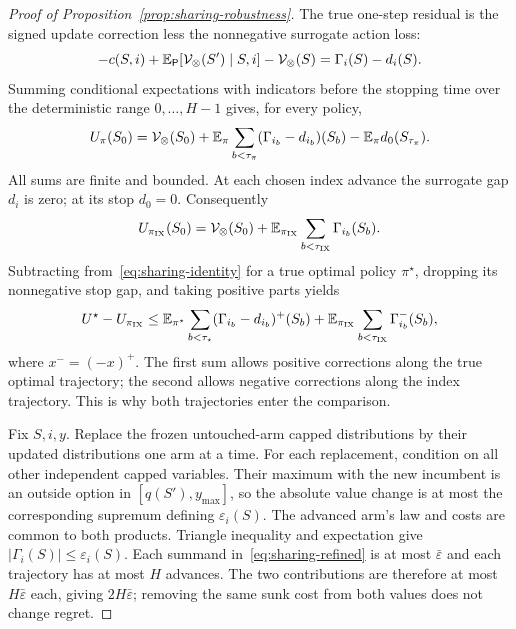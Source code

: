 \begin{proof}[Proof of Proposition~\ref{prop:sharing-robustness}]
The true one-step residual is the signed update correction less the
nonnegative surrogate action loss:
\begin{equation}
 -c(S,i)+\mathbb{E}_{\mathsf P}[\mathcal V_\otimes(S')\mid S,i]-\mathcal V_\otimes(S)
       =\Gamma_i(S)-d_i(S).
 \label{eq:sharing-residual}
\end{equation}
Summing conditional expectations with indicators before the stopping time over
the deterministic range $0,\ldots,H-1$ gives, for every policy,
\begin{equation}
 U_\pi(S_0)=\mathcal V_\otimes(S_0)
 +\mathbb{E}_\pi\sum_{b<\tau_\pi}(\Gamma_{i_b}-d_{i_b})(S_b)
 -\mathbb{E}_\pi d_0(S_{\tau_\pi}).
 \label{eq:sharing-identity}
\end{equation}
All sums are finite and bounded. At each chosen index advance the surrogate
gap $d_i$ is zero; at its stop $d_0=0$. Consequently
\begin{equation}
 U_{\pi_{\rm IX}}(S_0)=\mathcal V_\otimes(S_0)
       +\mathbb{E}_{\pi_{\rm IX}}\sum_{b<\tau_{\rm IX}}\Gamma_{i_b}(S_b).
 \label{eq:sharing-index-identity}
\end{equation}
Subtracting from~\eqref{eq:sharing-identity} for a true optimal policy
$\pi^\star$, dropping its nonnegative stop gap, and taking positive parts yields
\begin{equation}
 U^\star-U_{\pi_{\rm IX}}
 \le\mathbb{E}_{\pi^\star}\sum_{b<\tau_\star}(\Gamma_{i_b}-d_{i_b})^+(S_b)
   +\mathbb{E}_{\pi_{\rm IX}}\sum_{b<\tau_{\rm IX}}\Gamma_{i_b}^-(S_b),
 \label{eq:sharing-refined}
\end{equation}
where $x^-=(-x)^+$. The first sum allows positive corrections along the true
optimal trajectory; the second allows negative corrections along the index
trajectory. This is why both trajectories enter the comparison.

Fix $S,i,y$. Replace the frozen untouched-arm capped distributions by their
updated distributions one arm at a time. For each replacement, condition on
all other independent capped variables. Their maximum with the new incumbent
is an outside option in $[q(S'),y_{\max}]$, so the absolute value change is at
most the corresponding supremum defining $\varepsilon_i(S)$. The advanced
arm's law and costs are common to both products. Triangle inequality and expectation give
$|\Gamma_i(S)|\le\varepsilon_i(S)$. Each summand
in~\eqref{eq:sharing-refined} is at most $\bar\varepsilon$ and each trajectory
has at most $H$ advances. The two contributions are therefore at most
$H\bar\varepsilon$ each, giving $2H\bar\varepsilon$; removing the same sunk
cost from both values does not change regret.
\end{proof}

